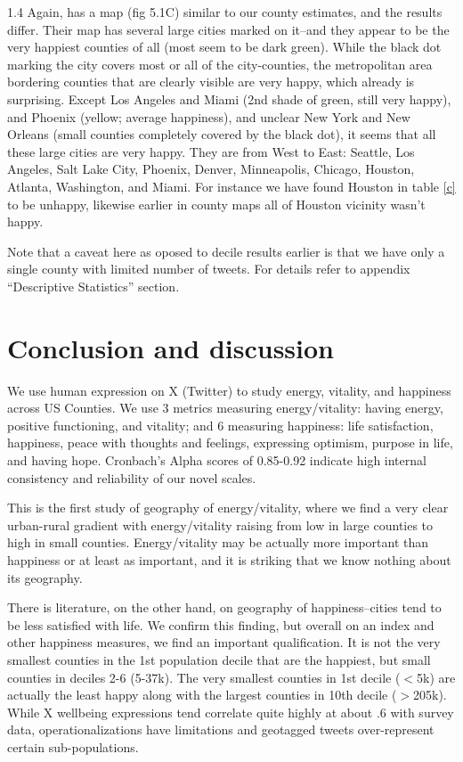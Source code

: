 \documentclass[10pt, letterpaper]{article}
\begin{document}
\begin{spacing}{1.4}
Again, \citet{kjell2023towards} has a map (fig 5.1C) similar to our county
estimates, and the results differ. Their map has several large cities marked on
it--and they appear to be the very happiest counties of all (most seem to be dark green).
 While the black dot marking the city covers most or all of the city-counties,
 the metropolitan area bordering counties that are clearly visible are very
 happy, which already is surprising. Except Los Angeles and Miami (2nd shade of
green, still very happy), and Phoenix (yellow; average happiness), and unclear New York
and New Orleans (small counties completely covered by the black dot), it seems
that all these large cities are very happy. They are from West to East: Seattle,
Los Angeles, Salt Lake City, Phoenix, Denver, Minneapolis, Chicago, Houston,
Atlanta, Washington, and Miami. For instance we have found Houston in  table
\ref{c} to be unhappy, likewise earlier in county maps all of Houston vicinity
wasn't happy. 

Note that a caveat here as oposed to decile results earlier is that we have only
a single county with limited number of tweets. %
 For details refer to appendix ``Descriptive Statistics'' section. 
 

\section{Conclusion and discussion}


We use human expression on X (Twitter)  to study energy, vitality, and happiness
 across US Counties. We use 3 metrics measuring energy/vitality: having energy, positive
functioning, and vitality; and 6 measuring happiness: life
satisfaction, happiness, peace with thoughts and feelings, expressing optimism,
purpose in life, and having hope. Cronbach's Alpha scores of 0.85-0.92 indicate high internal
consistency and reliability of our novel scales. 

This is the first study of geography of energy/vitality, where we
find a very clear urban-rural gradient with energy/vitality raising from low in large counties to high in small
counties. Energy/vitality may be actually more important than happiness or at
least as important, and it is striking that we know nothing about its geography.  
 
There is literature, on the other hand, on geography of happiness--cities tend
to be less satisfied with life. We confirm this finding, but overall on an
index and other happiness measures, we find an important qualification. It is
not the very smallest counties in the 1st population
decile that are the happiest, but small counties in deciles 2-6 (5-37k).
The very smallest counties in 1st decile ($<$5k) are actually the least happy along with the
largest counties in 10th decile ($>$205k).
%
While X wellbeing expressions tend correlate quite highly at about .6
with survey data, operationalizations have limitations and
geotagged tweets over-represent certain sub-populations.


\end{spacing}
\end{document}
